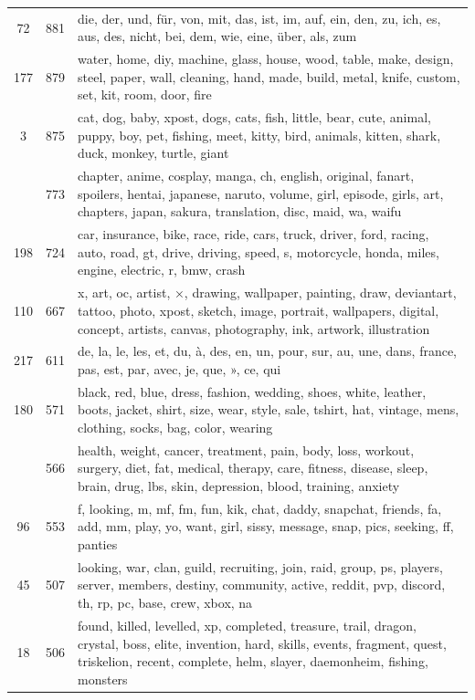 \documentclass[11pt,a4paper,twoside]{article}
\begin{document}
\begin{longtable}[t]{cr >{\raggedright\arraybackslash}p{}}
72 & 881 & die, der, und, für, von, mit, das, ist, im, auf, ein, den, zu, ich, es, aus, des, nicht, bei, dem, wie, eine, über, als, zum\\
177 & 879 & water, home, diy, machine, glass, house, wood, table, make, design, steel, paper, wall, cleaning, hand, made, build, metal, knife, custom, set, kit, room, door, fire\\
3 & 875 & cat, dog, baby, xpost, dogs, cats, fish, little, bear, cute, animal, puppy, boy, pet, fishing, meet, kitty, bird, animals, kitten, shark, duck, monkey, turtle, giant\\
\addlinespace
251 & 773 & chapter, anime, cosplay, manga, ch, english, original, fanart, spoilers, hentai, japanese, naruto, volume, girl, episode, girls, art, chapters, japan, sakura, translation, disc, maid, wa, waifu\\
198 & 724 & car, insurance, bike, race, ride, cars, truck, driver, ford, racing, auto, road, gt, drive, driving, speed, s, motorcycle, honda, miles, engine, electric, r, bmw, crash\\
110 & 667 & x, art, oc, artist, ×, drawing, wallpaper, painting, draw, deviantart, tattoo, photo, xpost, sketch, image, portrait, wallpapers, digital, concept, artists, canvas, photography, ink, artwork, illustration\\
217 & 611 & de, la, le, les, et, du, à, des, en, un, pour, sur, au, une, dans, france, pas, est, par, avec, je, que, », ce, qui\\
180 & 571 & black, red, blue, dress, fashion, wedding, shoes, white, leather, boots, jacket, shirt, size, wear, style, sale, tshirt, hat, vintage, mens, clothing, socks, bag, color, wearing\\
\addlinespace
195 & 566 & health, weight, cancer, treatment, pain, body, loss, workout, surgery, diet, fat, medical, therapy, care, fitness, disease, sleep, brain, drug, lbs, skin, depression, blood, training, anxiety\\
96 & 553 & f, looking, m, mf, fm, fun, kik, chat, daddy, snapchat, friends, fa, add, mm, play, yo, want, girl, sissy, message, snap, pics, seeking, ff, panties\\
45 & 507 & looking, war, clan, guild, recruiting, join, raid, group, ps, players, server, members, destiny, community, active, reddit, pvp, discord, th, rp, pc, base, crew, xbox, na\\
18 & 506 & found, killed, levelled, xp, completed, treasure, trail, dragon, crystal, boss, elite, invention, hard, skills, events, fragment, quest, triskelion, recent, complete, helm, slayer, daemonheim, fishing, monsters\\
\bottomrule
\end{longtable}
\end{document}
